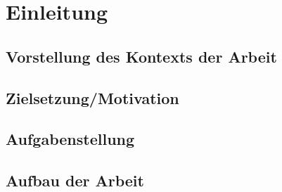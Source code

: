 \chapter{Einleitung}

\section{Vorstellung des Kontexts der Arbeit}

\section{Zielsetzung/Motivation}

\section{Aufgabenstellung}

\section{Aufbau der Arbeit}